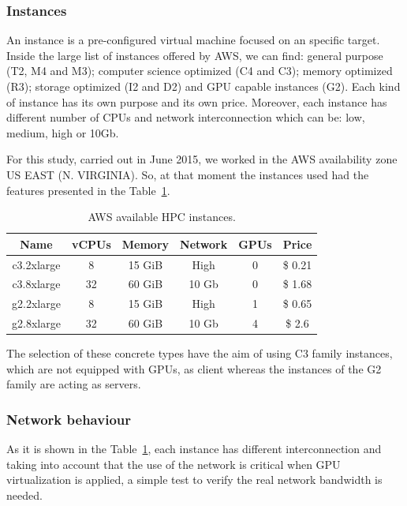 \documentclass[a4paper,twoside]{article}
\begin{document}
\subsubsection{Instances}

An instance is a pre-configured virtual machine focused on an 
specific target. Inside the large list of instances offered by AWS, 
we can find: general purpose (T2, M4 and M3); computer science optimized 
(C4 and C3); memory optimized (R3); storage optimized (I2 and D2) and 
GPU capable instances (G2). Each kind of instance has its own purpose and its 
own price. Moreover, each instance has different number of CPUs and network 
interconnection which can be: low, medium, high or 10Gb.

For this study, carried out in June 2015, we worked in the AWS availability zone US EAST (N. VIRGINIA). 
So, at that moment the instances used had the features presented in the Table~\ref{table:awsInstances}. 

\begin{table}[htb]
\renewcommand{\arraystretch}{1.3}
\caption{AWS available HPC instances.}
\label{table:awsInstances}
\tabcolsep=0.09cm
\begin{center}\begin{tabular}{cccccc}
Name & vCPUs & Memory & Network & GPUs & Price\\ \hline \hline
c3.2xlarge & 8 & 15 GiB & High & 0 & \$ 0.21\\ \hline
c3.8xlarge & 32 & 60 GiB & 10 Gb & 0 & \$ 1.68 \\ \hline
g2.2xlarge & 8 & 15 GiB & High & 1 & \$ 0.65\\ \hline
g2.8xlarge & 32 & 60 GiB & 10 Gb & 4 & \$ 2.6 \\ \hline
\end{tabular}\end{center}\end{table}

The selection of these concrete types have the aim of using C3 family instances, which are not equipped with GPUs, as client whereas the instances of the G2 family are acting as servers.   

\subsubsection{Network behaviour}
As it is shown in the Table~\ref{table:awsInstances}, each instance has different 
interconnection and taking into account that the use of the network 
is critical when GPU virtualization is applied, a simple test to verify the 
real network bandwidth is needed.
\end{document}
